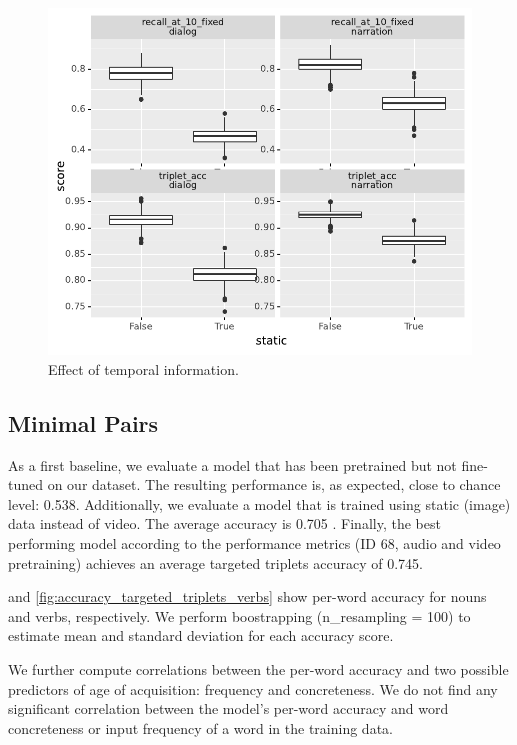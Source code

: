 \begin{figure}[htb]
  \centering
  \includegraphics[width=\columnwidth]{results/ablations/static.pdf}
  \caption{Effect of temporal information.}
  \label{fig:static}
\end{figure}


\subsection{Minimal Pairs}
As a first baseline, we evaluate a model that has been pretrained but not fine-tuned on our dataset. The resulting performance is, as expected, close to chance level: 0.538. Additionally, we evaluate a model that is trained using static (image) data instead of video. The average accuracy is 0.705 . Finally, the best performing model according to the
performance metrics (ID 68, audio and video pretraining) achieves an average
targeted triplets accuracy of 0.745.

 and
\ref{fig:accuracy_targeted_triplets_verbs} show per-word
accuracy for nouns and verbs, respectively. We perform boostrapping (n\_resampling = 100) to estimate mean and standard deviation for each accuracy score.

We further compute correlations between the per-word accuracy and two 
possible predictors of age of acquisition: frequency and concreteness. 
We do not find any significant correlation between the model's per-word 
accuracy and word concreteness or input frequency of a word in the 
training data.




